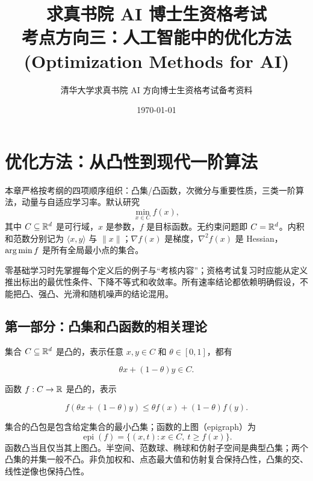 \documentclass[11pt]{ctexart}
\title{\bfseries 求真书院 AI 博士生资格考试\\考点方向三：人工智能中的优化方法 (Optimization Methods for AI)}
\author{清华大学求真书院 AI 方向博士生资格考试备考资料}
\date{\today}
\begin{document}
\maketitle
\tableofcontents

\label{sec:optimization}
\section{优化方法：从凸性到现代一阶算法}


\begin{teaching}
本章严格按考纲的四项顺序组织：凸集/凸函数，次微分与重要性质，三类一阶算法，动量与自适应学习率。默认研究
\[
  \min_{x\in C}f(x),
\]
其中 \(C\subseteq\mathbb{R}^d\) 是可行域，\(x\) 是参数，\(f\) 是目标函数。无约束问题即 \(C=\mathbb{R}^d\)。内积和范数分别记为 \(\langle x,y\rangle\) 与 \(\|x\|\)；\(\nabla f(x)\) 是梯度，\(\nabla^2f(x)\) 是 Hessian，\(\operatorname*{arg\,min} f\) 是所有全局最小点的集合。
\end{teaching}

\begin{remark}[怎样使用本章]
零基础学习时先掌握每个定义后的例子与“考核内容”；资格考试复习时应能从定义推出标出的最优性条件、下降不等式和收敛率。所有速率结论都依赖明确假设，不能把凸、强凸、光滑和随机噪声的结论混用。
\end{remark}

\subsection{第一部分：凸集和凸函数的相关理论}


\begin{definition}[凸集与凸函数]
集合 \(C\subseteq\mathbb{R}^d\) 是凸的，表示任意 \(x,y\in C\) 和 \(\theta\in[0,1]\)，都有

\[
  \theta x+(1-\theta)y\in C.
\]

函数 \(f:C\to\mathbb{R}\) 是凸的，表示

\[
  f(\theta x+(1-\theta)y)
  \le
  \theta f(x)+(1-\theta)f(y).
\]
\end{definition}

集合的凸包是包含给定集合的最小凸集；函数的上图（epigraph）为
\[
  \operatorname{epi}(f)=\{(x,t):x\in C,\ t\ge f(x)\}.
\]
函数凸当且仅当其上图凸。半空间、范数球、椭球和仿射子空间是典型凸集；两个凸集的并集一般不凸。非负加权和、点态最大值和仿射复合保持凸性，凸集的交、线性逆像也保持凸性。
\end{document}
